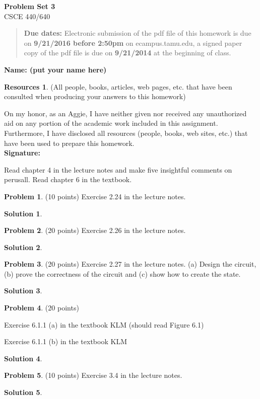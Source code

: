 \documentclass{article}
\theoremstyle{definition}
\newtheorem{problem}{Problem}
\newtheorem*{solution}{Solution}
\newtheorem*{resources}{Resources}
\newcommand{\name}[1]{\noindent\textbf{Name: #1}}
\newcommand{\honor}{\noindent On my honor, as an Aggie, I have neither
  given nor received any unauthorized aid on any portion of the
  academic work included in this assignment. Furthermore, I have
  disclosed all resources (people, books, web sites, etc.) that have
  been used to prepare this homework. \\[1ex]
 \textbf{Signature:} \underline{\hspace*{5cm}} }
\newcommand{\problemset}[1]{\begin{center}\textbf{Problem Set #1}\\ 
CSCE 440/640\end{center}}
\newcommand{\duedate}[2]{\begin{quote}\textbf{Due dates:} Electronic
    submission of the pdf file of this homework is due on \textbf{#1} on ecampus.tamu.edu, a signed paper copy
    of the pdf file is due on \textbf{#2} at the beginning of
    class. \end{quote} }
\begin{document}
\problemset{3}
\duedate{9/21/2016 before 2:50pm}{9/21/2014}
\name{ (put your name here)}
\begin{resources} (All people, books, articles, web pages, etc. that
  have been consulted when producing your answers to this homework)
\end{resources}
\honor

\newpage

\noindent Read chapter 4 in the lecture notes and make five insightful
comments on perusall. Read chapter 6 in the textbook. \medskip


\begin{problem}(10 points) 
Exercise 2.24 in the lecture notes. 
\end{problem}
\begin{solution}
\end{solution}

\begin{problem}(20 points) 
Exercise 2.26 in the lecture notes. 
\end{problem}
\begin{solution}
\end{solution}

\begin{problem}(20 points)
Exercise 2.27 in the lecture notes. (a) Design the circuit, 
(b) prove the correctness of the
circuit and (c) show how to create the state. 
\end{problem}
\begin{solution}
\end{solution}

\begin{problem}(20 points)
\begin{compactenum}[(a)]
\item Exercise 6.1.1 (a) in the textbook KLM (should read Figure 6.1)
\item Exercise 6.1.1 (b) in the textbook KLM
\end{compactenum}
\end{problem}
\begin{solution}
\end{solution}


\begin{problem} (10 points)
Exercise 3.4 in the lecture notes. 
\end{problem}
\begin{solution}
\end{solution}
\end{document}
